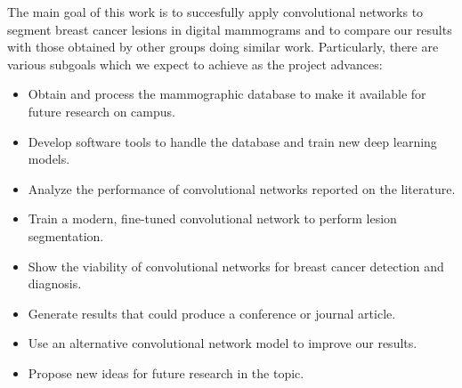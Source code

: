 The main goal of this work is to succesfully apply convolutional networks to segment breast cancer lesions in digital mammograms and to compare our results with those obtained by other groups doing similar work.
Particularly, there are various subgoals which we expect to achieve as the project advances:
\begin{itemize}
	\item Obtain and process the mammographic database to make it available for future research on campus.
	\item Develop software tools to handle the database and train new deep learning models.
	\item Analyze the performance of convolutional networks reported on the literature.
	\item Train a modern, fine-tuned convolutional network to perform lesion segmentation.
	\item Show the viability of convolutional networks for breast cancer detection and diagnosis.
	\item Generate results that could produce a conference or journal article.
	\item Use an alternative convolutional network model to improve our results.
	\item Propose new ideas for future research in the topic.
\end{itemize}
